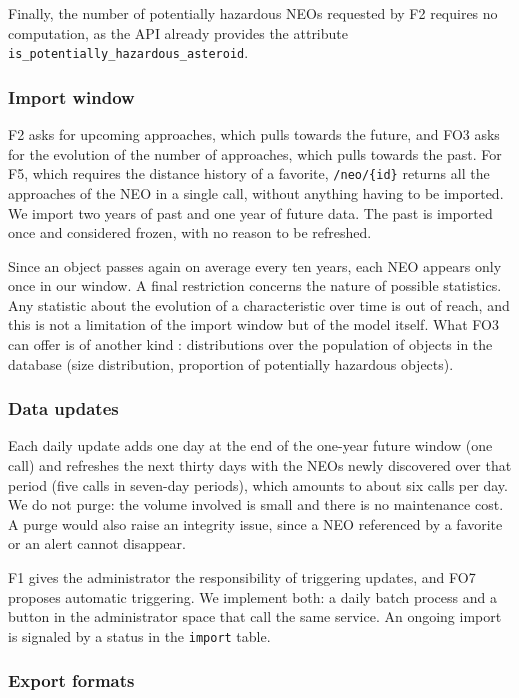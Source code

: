 Finally, the number of potentially hazardous NEOs requested by F2 requires
no computation, as the API already provides the attribute
\texttt{is\_potentially\_hazardous\_asteroid}.

\subsubsection{Import window}

F2 asks for upcoming approaches, which pulls towards the future, and FO3
asks for the evolution of the number of approaches, which pulls towards the
past. For F5, which requires the distance history of a favorite,
\texttt{/neo/\{id\}} returns all the approaches of the NEO in a single call,
without anything having to be imported. We import two years of past and one
year of future data. The past is imported once and considered frozen, with
no reason to be refreshed.

Since an object passes again on average every ten years, each NEO appears
only once in our window. A final restriction concerns the
nature of possible statistics. Any statistic about the evolution of a
characteristic over time is out of reach, and this is not a limitation of
the import window but of the model itself. What FO3 can offer is of another
kind : distributions over the population of objects in the database (size
distribution, proportion of potentially hazardous objects).

\subsubsection{Data updates}

Each daily update adds one day at the end of the one-year future window
(one call) and refreshes the next thirty days with the NEOs newly discovered
over that period (five calls in seven-day periods), which amounts to about
six calls per day. We do not purge: the volume involved is small and there
is no maintenance cost. A purge would also raise an integrity issue, since a
NEO referenced by a favorite or an alert cannot disappear.

F1 gives the administrator the responsibility of triggering updates, and FO7
proposes automatic triggering. We implement both: a daily batch process and
a button in the administrator space that call the same service. An ongoing
import is signaled by a status in the \texttt{import} table.

\subsubsection{Export formats}

